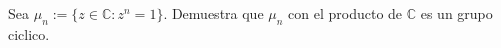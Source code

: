 \question
Sea $\mu_n := \{z\in\mathbb{C}: z^n=1\}$. Demuestra que $\mu_n$ con el producto de $\mathbb{C}$ es un grupo ciclico.